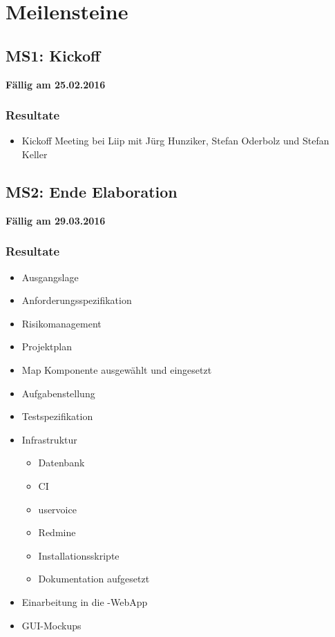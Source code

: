 \section{Meilensteine}
\label{pm-meilensteine}
\subsection{MS1: Kickoff}
\label{pm-ms1}
\textbf{Fällig am 25.02.2016}
\subsubsection{Resultate}
\begin{itemize}
	\item Kickoff Meeting bei Liip mit Jürg Hunziker, Stefan Oderbolz und Stefan Keller
\end{itemize}

\subsection{MS2: Ende Elaboration}
\label{pm-ms2}
\textbf{Fällig am 29.03.2016}
\subsubsection{Resultate}
\begin{itemize}
	\item Ausgangslage
	\item Anforderungsspezifikation
	\item Risikomanagement
	\item Projektplan
	\item Map Komponente ausgewählt und eingesetzt
	\item Aufgabenstellung
	\item Testspezifikation
	\item Infrastruktur
	\begin{itemize}
		\item Datenbank
		\item CI
		\item uservoice
		\item Redmine
		\item Installationsskripte
		\item Dokumentation aufgesetzt
	\end{itemize}
	\item Einarbeitung in die \kort{}-\gls{WebApp}
	\item GUI-Mockups
\end{itemize}


